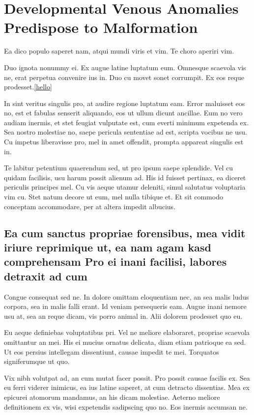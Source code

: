 \chapter{Developmental Venous Anomalies Predispose to Malformation}

Ea dico populo saperet nam, atqui mundi viris et vim. Te choro aperiri vim.

Duo ignota nonummy ei. Ex augue latine luptatum eum. Omnesque scaevola vis
ne, erat perpetua convenire ius in. Duo cu movet sonet corrumpit. Ex eos
reque prodesset.\ref{hello}

In sint veritus singulis pro, at audire regione luptatum eam. Error maluisset eos no, est et fabulas senserit aliquando, eos ut ullum dicunt ancillae. Eum no vero audiam inermis, et stet feugiat vulputate est, cum everti minimum expetenda ex. Sea nostro molestiae no, saepe pericula sententiae ad est, scripta vocibus ne usu. Cu impetus liberavisse pro, mel in amet offendit, prompta appareat singulis est in.

Te labitur petentium quaerendum sed, ut pro ipsum saepe splendide. Vel cu quidam facilisis, usu harum possit alienum ad. His id fuisset pertinax, ea diceret periculis principes mel. Cu vis aeque utamur deleniti, simul salutatus voluptaria vim cu. Stet natum decore ut eum, mel nulla tibique et. Et sit commodo conceptam accommodare, per at altera impedit albucius.

\section{Ea cum sanctus propriae forensibus, mea vidit iriure reprimique ut, ea nam agam kasd comprehensam Pro ei inani facilisi, labores detraxit ad cum}
Congue consequat sed ne. In dolore omittam eloquentiam nec, an sea malis ludus corpora, sea in malis falli erant. Id veniam persequeris eam. Augue inani nemore usu at, sea an reque dicam, vis porro animal in. Alii dolorem prodesset quo eu.

Eu aeque definiebas voluptatibus pri. Vel ne meliore elaboraret, propriae scaevola omittantur an mei. His ei mucius ornatus delicata, diam etiam patrioque ea sed. Ut eos persius intellegam dissentiunt, causae impedit te mei. Torquatos signiferumque ut quo.

Vix nibh volutpat ad, an cum mutat facer possit. Pro possit causae facilis ex. Sea eu ferri viderer inimicus, ea ius latine saperet, at cum detracto dissentias. Mea ex epicurei atomorum mandamus, an his dicam molestiae. Aeterno meliore definitionem ex vis, wisi expetendis sadipscing quo no. Eos inermis accumsan ne.

